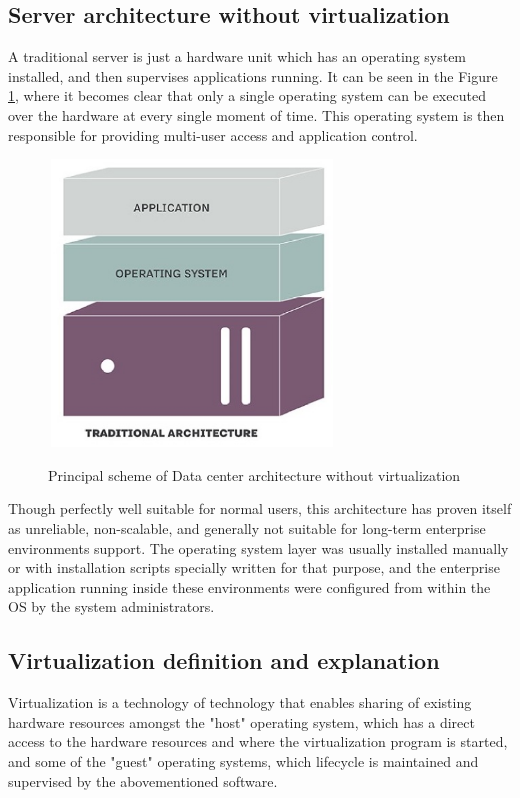 \subsection{Server architecture without virtualization}

A traditional server is just a hardware unit
which has an operating system installed,
and then supervises applications running.
It can be seen in the Figure \ref{fig:TraditionalAndVirtualInfra},
where it becomes clear that only a single
operating system can be executed over the hardware at every single moment of time.
This operating system is then responsible for providing multi-user access and
application control.

\begin{figure}
\includegraphics[height=3in, width=3in]{traditional}
\caption{Principal scheme of Data center architecture without virtualization}
\cite{TraditionalAndVirtualInfra}
\label{fig:TraditionalAndVirtualInfra}
\end{figure}

Though perfectly well suitable for normal users, this architecture
has proven itself as unreliable, non-scalable,
and generally not suitable for long-term enterprise environments support.
The operating system layer was usually installed manually or with
installation scripts specially written for that purpose,
and the enterprise application running inside these
environments were configured from within the OS by the system administrators.

\subsection{Virtualization definition and explanation}

\begin{definition}
Virtualization is a technology of technology that enables sharing of
existing hardware resources amongst the "host" operating system,
which has a direct access to the hardware resources and where the
virtualization program is started, and some of the "guest" operating systems,
which lifecycle is maintained and supervised by the abovementioned software.
\end{definition}

